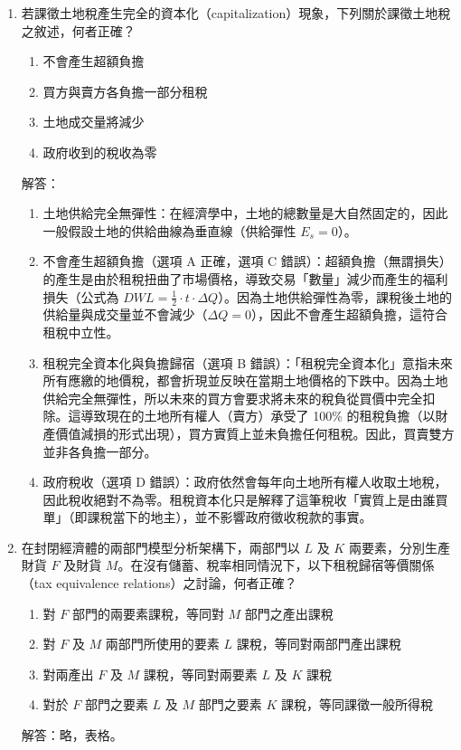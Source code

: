 \documentclass[12pt, a4paper]{article}
\begin{document}
\begin{enumerate}
    \item 若課徵土地稅產生完全的資本化（capitalization）現象，下列關於課徵土地稅之敘述，何者正確？
    \begin{enumerate}[label=\Alph*.]
        \item 不會產生超額負擔
        \item 買方與賣方各負擔一部分租稅
        \item 土地成交量將減少
        \item 政府收到的稅收為零
    \end{enumerate}
    解答：
    \begin{enumerate}[1.]
        \item 土地供給完全無彈性：在經濟學中，土地的總數量是大自然固定的，因此一般假設土地的供給曲線為垂直線（供給彈性 \(E_s = 0\)）。
        \item 不會產生超額負擔（選項 A 正確，選項 C 錯誤）：超額負擔（無謂損失）的產生是由於租稅扭曲了市場價格，導致交易「數量」減少而產生的福利損失（公式為 \(DWL = \frac{1}{2} \cdot t \cdot \Delta Q\)）。因為土地供給彈性為零，課稅後土地的供給量與成交量並不會減少（\(\Delta Q = 0\)），因此不會產生超額負擔，這符合租稅中立性。
        \item 租稅完全資本化與負擔歸宿（選項 B 錯誤）：「租稅完全資本化」意指未來所有應繳的地價稅，都會折現並反映在當期土地價格的下跌中。因為土地供給完全無彈性，所以未來的買方會要求將未來的稅負從買價中完全扣除。這導致現在的土地所有權人（賣方）承受了 100\% 的租稅負擔（以財產價值減損的形式出現），買方實質上並未負擔任何租稅。因此，買賣雙方並非各負擔一部分。
        \item 政府稅收（選項 D 錯誤）：政府依然會每年向土地所有權人收取土地稅，因此稅收絕對不為零。租稅資本化只是解釋了這筆稅收「實質上是由誰買單」（即課稅當下的地主），並不影響政府徵收稅款的事實。
    \end{enumerate}

    \item 在封閉經濟體的兩部門模型分析架構下，兩部門以 \(L\) 及 \(K\) 兩要素，分別生產財貨 \(F\) 及財貨 \(M\)。在沒有儲蓄、稅率相同情況下，以下租稅歸宿等價關係（tax equivalence relations）之討論，何者正確？
    \begin{enumerate}[label=\Alph*.]
        \item 對 \(F\) 部門的兩要素課稅，等同對 \(M\) 部門之產出課稅
        \item 對 \(F\) 及 \(M\) 兩部門所使用的要素 \(L\) 課稅，等同對兩部門產出課稅
        \item 對兩產出 \(F\) 及 \(M\) 課稅，等同對兩要素 \(L\) 及 \(K\) 課稅
        \item 對於 \(F\) 部門之要素 \(L\) 及 \(M\) 部門之要素 \(K\) 課稅，等同課徵一般所得稅
    \end{enumerate}
    解答：略，表格。


\end{enumerate}
\end{document}

